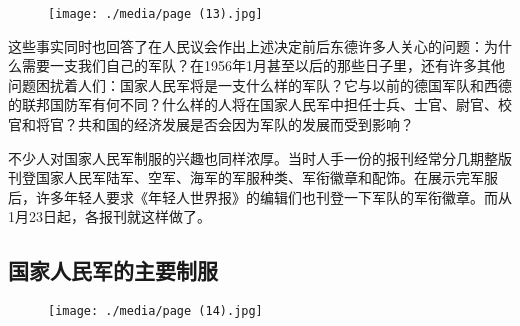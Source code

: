 \begin{figure}
\texttt{[image: ./media/page (13).jpg]}
\end{figure}

这些事实同时也回答了在人民议会作出上述决定前后东德许多人关心的问题：为什么需要一支我们自己的军队？在1956年1月甚至以后的那些日子里，还有许多其他问题困扰着人们：国家人民军将是一支什么样的军队？它与以前的德国军队和西德的联邦国防军有何不同？什么样的人将在国家人民军中担任士兵、士官、尉官、校官和将官？共和国的经济发展是否会因为军队的发展而受到影响？

不少人对国家人民军制服的兴趣也同样浓厚。当时人手一份的报刊经常分几期整版刊登国家人民军陆军、空军、海军的军服种类、军衔徽章和配饰。在展示完军服后，许多年轻人要求《年轻人世界报》的编辑们也刊登一下军队的军衔徽章。而从1月23日起，各报刊就这样做了。

\subsection{国家人民军的主要制服}

\begin{figure}
\texttt{[image: ./media/page (14).jpg]}
\end{figure}

